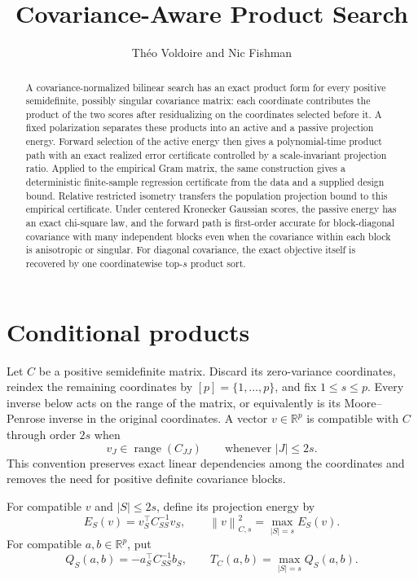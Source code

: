 \documentclass[a4paper,11pt,english]{article}
\title{Covariance-Aware Product Search}
\author{Th\'eo Voldoire and Nic Fishman}
\date{}
\newcommand{\norm}[1]{\left\lVert #1\right\rVert}
\newcommand{\R}{\mathbb R}
\begin{document}
\maketitle

\begin{abstract}
A covariance-normalized bilinear search has an exact product form for
every positive semidefinite, possibly singular covariance matrix: each
coordinate contributes the product of the two scores after residualizing
on the coordinates selected before it.  A fixed polarization separates
these products into an active and a passive projection energy.  Forward
selection of the active energy then gives a polynomial-time product path with
an exact realized error certificate controlled by a scale-invariant
projection ratio.  Applied to the empirical Gram matrix, the same
construction gives a deterministic finite-sample regression certificate
from the data and a supplied design bound.  Relative restricted isometry
transfers the population projection bound to this empirical certificate.  Under
centered Kronecker Gaussian scores, the passive energy has an exact
chi-square law, and the forward path is first-order accurate for
block-diagonal covariance with many independent blocks even when the
covariance within each block is anisotropic or singular.  For diagonal
covariance, the exact objective itself is recovered by one coordinatewise
top-$s$ product sort.
\end{abstract}

\section{Conditional products}

Let $C$ be a positive semidefinite matrix.  Discard its zero-variance
coordinates, reindex the remaining coordinates by $[p]=\{1,\ldots,p\}$,
and fix $1\le s\le p$.  Every inverse below acts on the range of the
matrix, or equivalently is its Moore--Penrose inverse in the original
coordinates.  A vector $v\in\R^p$ is compatible with $C$ through order
$2s$ when
\begin{equation}\label{eq:compatibility}
        v_J\in\operatorname{range}(C_{JJ})
        \qquad\text{whenever }|J|\le2s.
\end{equation}
This convention preserves exact linear dependencies among the
coordinates and removes the need for positive definite covariance
blocks.

For compatible $v$ and $|S|\le2s$, define its projection energy by
\begin{equation}\label{eq:projection-energy}
        E_S(v)=v_S^\top C_{SS}^{-1}v_S,
        \qquad
        \norm{v}_{C,s}^2=\max_{|S|=s}E_S(v).
\end{equation}
For compatible $a,b\in\R^p$, put
\begin{equation}\label{eq:bilinear-search}
        Q_S(a,b)=-a_S^\top C_{SS}^{-1}b_S,
        \qquad
        T_C(a,b)=\max_{|S|=s}Q_S(a,b).
\end{equation}
\end{document}
